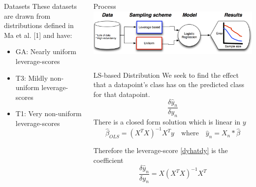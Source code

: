 \documentclass{beamer}
\newenvironment{pblock}{\begin{minipage}[b]{\linewidth}
	\begin{block}}{\end{block} 	\end{minipage}\vspace*{15pt}}
\begin{document}
{\begin{columns}[T]
\begin{column}{.3\linewidth}
\begin{pblock}{Datasets}
	These datasets are drawn from distributions defined in Ma et al. [1] and have: 
	\begin{itemize}
	\item GA: Nearly uniform leverage-scores
	\item T3: Mildly non-uniform leverage-scores
	\item T1: Very non-uniform leverage-scores
	\end{itemize}  
	
	\end{pblock}
	
	
	\end{column}
	
	\begin{column}{.69\linewidth}
			\begin{block}{Process}
				\includegraphics[width=\linewidth]{ThoughModel.png}
			\end{block}
	
	
	\begin{columns}[t]
	
    	\begin{column}{.5\linewidth}


	\begin{pblock}{LS-based Distribution}	
	We seek to find the effect that a datapoint's class has on the predicted class for that datapoint.
	    \begin{equation}
	    \label{dyhatdy}
	    \frac{\delta \hat{y}_n}{\delta y_n}
	    \end{equation}
	There is a closed form solution which is linear in $y$
		\begin{equation*}
			\hat{\beta}_{OLS} = \left( X^T X \right)^{-1} X^T y \quad \text{where} \quad \hat{y}_n = X_n*\hat{\beta}
		\end{equation*}
		
	Therefore the leverage-score \eqref{dyhatdy} is the coefficient
		\begin{equation*}
			\frac{\delta \hat{y}_n}{\delta y_n} = X \left( X^T X \right)^{-1} X^T
		\end{equation*}
	
	\end{pblock}


\end{column}
\end{columns}
\end{column}
\end{columns}}
\end{document}

